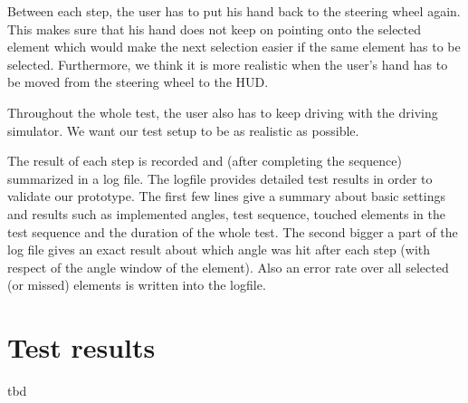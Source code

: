 \documentclass{sigchi-ext}
\begin{document}
Between each step, the user has to put his hand back to the steering wheel again. This makes sure that his hand does not keep on pointing onto the selected element which would make the next selection easier if the same element has to be selected. Furthermore, we think it is more realistic when the user's hand has to be moved from the steering wheel to the HUD.

Throughout the whole test, the user also has to keep driving with the driving simulator. We want our test setup to be as realistic as possible. 

The result of each step is recorded and (after completing the sequence) summarized in a log file. The logfile provides detailed test results in order to validate our prototype. The first few lines give a summary about basic settings and results such as implemented angles, test sequence, touched elements in the test sequence and the duration of the whole test. The second bigger a part of the log file gives an exact result about which angle was hit after each step (with respect of the angle window of the element). Also an error rate over all selected (or missed) elements is written into the logfile.


\section{Test results}
tbd



\end{document}
